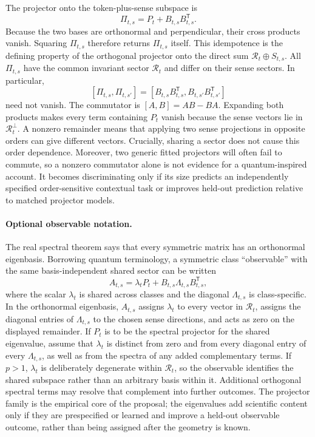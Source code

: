 \documentclass[
  aps,
  reprint,
  superscriptaddress,
  floatfix,
  nofootinbib,
  longbibliography
]{revtex4-2}
\newcommand{\T}{^{\mathsf{T}}}
\begin{document}
The projector onto the token-plus-sense subspace is
%
\begin{equation}
\label{eq:context-projector}
\Pi_{t,s}=P_t+B_{t,s}B_{t,s}\T .
\end{equation}
Because the two bases are orthonormal and perpendicular, their cross products
vanish.  Squaring $\Pi_{t,s}$ therefore returns $\Pi_{t,s}$ itself.  This
idempotence is the defining property of the orthogonal projector onto the
direct sum $\mathcal R_t\oplus S_{t,s}$.
%
All $\Pi_{t,s}$ have the common invariant sector $\mathcal R_t$ and differ on
their sense sectors.  In particular,
%
\begin{equation}
\label{eq:projector-commutator}
[\Pi_{t,s},\Pi_{t,s'}]
=
[B_{t,s}B_{t,s}\T,B_{t,s'}B_{t,s'}\T]
\end{equation}
%
need not vanish.  The commutator is $[A,B]=AB-BA$.  Expanding both products
makes every term containing $P_t$ vanish because the sense vectors lie in
$\mathcal R_t^\perp$.  A nonzero remainder means that applying two sense
projections in opposite orders can give different vectors.  Crucially,
sharing a sector does not cause this order dependence.  Moreover, two
generic fitted projectors will often fail to commute, so a nonzero commutator
alone is not evidence for a quantum-inspired account.  It becomes
discriminating only if its size predicts an independently specified
order-sensitive contextual task or improves held-out prediction relative to
matched projector models.

\paragraph{Optional observable notation.}
The real spectral theorem says that every symmetric matrix has an orthonormal
eigenbasis.  Borrowing quantum terminology, a symmetric class ``observable''
with the same basis-independent shared sector can be written
%
\begin{equation}
\label{eq:context-observable}
A_{t,s}
=\lambda_t P_t
 +B_{t,s}\Lambda_{t,s}B_{t,s}\T,
\end{equation}
%
where the scalar $\lambda_t$ is shared across classes and the diagonal
$\Lambda_{t,s}$ is class-specific.  In the orthonormal eigenbasis,
$A_{t,s}$ assigns $\lambda_t$ to every vector in $\mathcal R_t$, assigns the
diagonal entries of $\Lambda_{t,s}$ to the chosen sense directions, and acts
as zero on the displayed remainder.  If $P_t$ is to be the spectral projector
for the shared eigenvalue, assume that $\lambda_t$ is distinct from zero and
from every diagonal entry of every $\Lambda_{t,s}$, as well as from the spectra
of any added complementary terms.  If $p>1$, $\lambda_t$ is deliberately
degenerate within $\mathcal R_t$, so the observable identifies the shared
subspace rather than an arbitrary basis within it.  Additional orthogonal
spectral terms may resolve that complement into further outcomes.  The projector
family is the empirical core of the proposal; the eigenvalues add scientific
content only if they are prespecified or learned and improve a held-out
observable outcome, rather than being assigned after the geometry is known.
\end{document}
